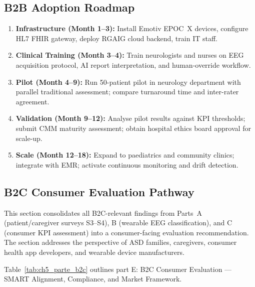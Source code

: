 \subsection{B2B Adoption Roadmap}

\begin{enumerate}[label=\textbf{Stage \arabic*:}, leftmargin=2.5cm]
    \item \textbf{Infrastructure (Month 1--3):} Install Emotiv EPOC~X devices, configure HL7 FHIR gateway, deploy RGAIG cloud backend, train IT staff.
    \item \textbf{Clinical Training (Month 3--4):} Train neurologists and nurses on EEG acquisition protocol, AI report interpretation, and human-override workflow.
    \item \textbf{Pilot (Month 4--9):} Run 50-patient pilot in neurology department with parallel traditional assessment; compare turnaround time and inter-rater agreement.
    \item \textbf{Validation (Month 9--12):} Analyse pilot results against KPI thresholds; submit CMM maturity assessment; obtain hospital ethics board approval for scale-up.
    \item \textbf{Scale (Month 12--18):} Expand to paediatrics and community clinics; integrate with EMR; activate continuous monitoring and drift detection.
\end{enumerate}

\iffalse %
\subsection{B2C Consumer Evaluation Pathway}
\label{sec:ch5_part_e_b2c}

This section consolidates all B2C-relevant findings from Parts~A (patient/caregiver surveys S3--S4), B (wearable EEG classification), and C (consumer KPI assessment) into a consumer-facing evaluation recommendation. The section addresses the perspective of ASD families, caregivers, consumer health app developers, and wearable device manufacturers.

\noindent Table~\ref{tab:ch5_parte_b2c} outlines part E: B2C Consumer Evaluation --- SMART Alignment, Compliance, and Market Framework.


